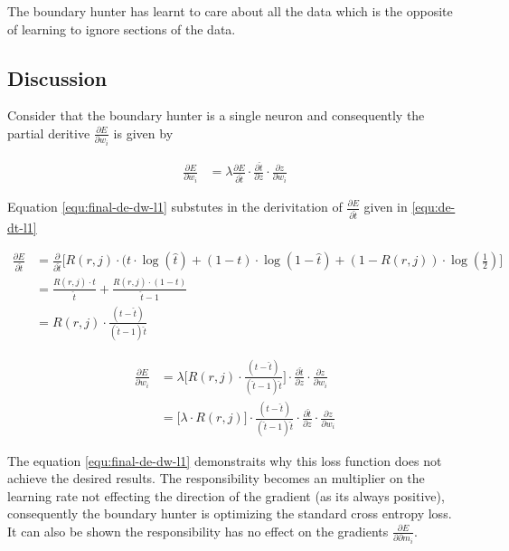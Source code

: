 \documentclass[notitlepage]{report}
\theoremstyle{definition}
\begin{document}
The boundary hunter has learnt to care about all the data which is the opposite of learning to ignore sections of the data.

\subsection{Discussion}
Consider that the boundary hunter is a single neuron and consequently the partial deritive $\frac{\partial E}{\partial w_i}$ is given by

\begin{align}
\frac{\partial E}{\partial w_i} &= \lambda \frac{\partial E}{\partial \widehat{t}} \cdot \frac{\partial \widehat{t}}{\partial z} \cdot \frac{\partial z}{\partial w_i}
\end{align}

Equation \ref{equ:final-de-dw-l1} substutes in the derivitation of $\frac{\partial E}{\partial \widehat{t}}$ given in \ref{equ:de-dt-l1} 

\begin{equation}
\begin{aligned}
\frac{\partial E}{\partial \widehat{t}} &= \frac{\partial}{\partial \widehat{t}} \big[ R(r, j) \cdot (t \cdot \log(\widehat{t}) + (1-t)\cdot \log(1 - \widehat{t}) + (1-R(r,j)) \cdot \log(\frac{1}{2}) \big]\\
&= \frac{R(r, j) \cdot t}{\widehat{t}} + \frac{R(r, j) \cdot (1 - t)}{\widehat{t} - 1}\\
&= R(r, j) \cdot \frac{(t - \widehat{t})}{(\widehat{t} - 1) \widehat{t}}
\label{equ:de-dt-l1}
\end{aligned}
\end{equation}

\begin{equation}
\begin{aligned}
\frac{\partial E}{\partial w_i} &= \lambda \big[ R(r, j) \cdot \frac{(t - \widehat{t})}{(\widehat{t} - 1) \widehat{t}} \big] \cdot \frac{\partial \widehat{t}}{\partial z} \cdot \frac{\partial z}{\partial w_i}\\
&= \big[\lambda \cdot R(r,j) \big] \cdot \frac{(t - \widehat{t})}{(\widehat{t} - 1) \widehat{t}} \cdot \frac{\partial \widehat{t}}{\partial z} \cdot \frac{\partial z}{\partial w_i}
\label{equ:final-de-dw-l1}
\end{aligned}
\end{equation}

The equation \ref{equ:final-de-dw-l1} demonstraits why this loss function does not achieve the desired results. The responsibility becomes an multiplier on the learning rate not effecting the direction of the gradient (as its always positive), consequently the boundary hunter is optimizing the standard cross entropy loss. It can also be shown the responsibility has no effect on the gradients $\frac{\partial E}{\partial \partial m_i}$.\\
\end{document}
